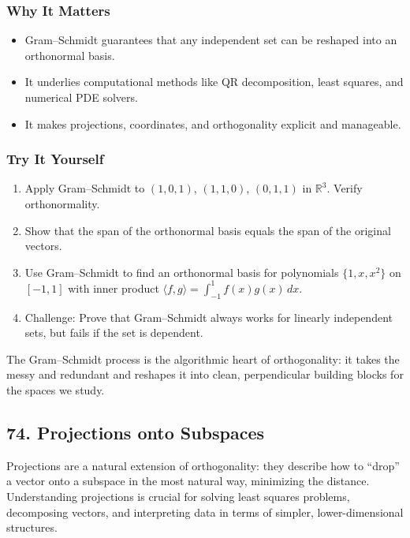 \documentclass[
  letterpaper,
  DIV=11,
  numbers=noendperiod]{scrreprt}
\providecommand{\tightlist}{%
  \setlength{\itemsep}{0pt}\setlength{\parskip}{0pt}}
\begin{document}
\subsubsection{Why It Matters}\label{why-it-matters-69}

\begin{itemize}
\tightlist
\item
  Gram--Schmidt guarantees that any independent set can be reshaped into
  an orthonormal basis.
\item
  It underlies computational methods like QR decomposition, least
  squares, and numerical PDE solvers.
\item
  It makes projections, coordinates, and orthogonality explicit and
  manageable.
\end{itemize}

\subsubsection{Try It Yourself}\label{try-it-yourself-72}

\begin{enumerate}
\def\labelenumi{\arabic{enumi}.}
\tightlist
\item
  Apply Gram--Schmidt to \((1,0,1)\), \((1,1,0)\), \((0,1,1)\) in
  \(\mathbb{R}^3\). Verify orthonormality.
\item
  Show that the span of the orthonormal basis equals the span of the
  original vectors.
\item
  Use Gram--Schmidt to find an orthonormal basis for polynomials
  \(\{1,x,x^2\}\) on \([-1,1]\) with inner product
  \(\langle f,g\rangle = \int_{-1}^1 f(x)g(x)\,dx\).
\item
  Challenge: Prove that Gram--Schmidt always works for linearly
  independent sets, but fails if the set is dependent.
\end{enumerate}

The Gram--Schmidt process is the algorithmic heart of orthogonality: it
takes the messy and redundant and reshapes it into clean, perpendicular
building blocks for the spaces we study.

\subsection{74. Projections onto
Subspaces}\label{projections-onto-subspaces}

Projections are a natural extension of orthogonality: they describe how
to ``drop'' a vector onto a subspace in the most natural way, minimizing
the distance. Understanding projections is crucial for solving least
squares problems, decomposing vectors, and interpreting data in terms of
simpler, lower-dimensional structures.
\end{document}
